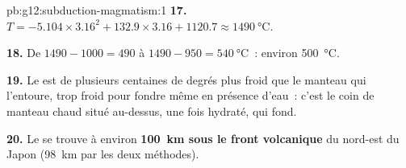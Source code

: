 \begin{solution}{pb:g12:subduction-magmatism:1}
\textbf{17.} $T = -5.104 \times 3.16^2 + 132.9 \times 3.16 + 1120.7 \approx
\qty{1490}{\celsius}$.

\textbf{18.} De $1490 - 1000 = 490$ à $1490 - 950 = \qty{540}{\celsius}$~:
environ \qty{500}{\celsius}.

\textbf{19.} Le  est de plusieurs centaines de degrés plus froid que
le manteau qui l'entoure, trop froid pour fondre même en présence
d'eau~: c'est le coin de manteau chaud situé au-dessus, une fois hydraté,
qui fond.

\textbf{20.} Le  se trouve à environ \textbf{\qty{100}{km}
sous le front volcanique} du nord-est du Japon (\qty{98}{km} par les deux
méthodes).
\end{solution}
